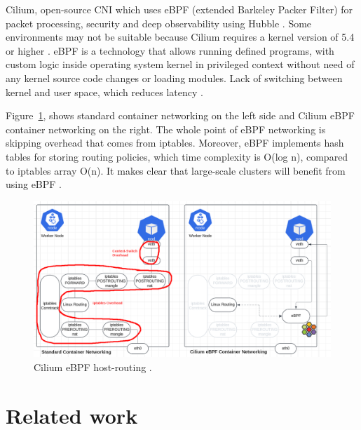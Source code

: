 Cilium, open-source CNI which uses eBPF (extended Barkeley Packer Filter) for packet processing, security and deep observability using Hubble \cite{CiliumOverview}. Some environments may not be suitable because Cilium requires a kernel version of 5.4 or higher \cite{CiliumInstall}. eBPF is a technology that allows running defined programs, with custom logic inside operating system kernel in privileged context without need of any kernel source code changes or loading modules. Lack of switching between kernel and user space, which reduces latency \cite{eBPF}. 

Figure~\ref{fig:ebpf_routing}, shows standard container networking on the left side and Cilium eBPF container networking on the right. The whole point of eBPF networking is skipping overhead that comes from iptables. Moreover, eBPF implements hash tables for storing routing policies, which time complexity is O(log n), compared to iptables array O(n). It makes clear that large-scale clusters will benefit from using eBPF \cite{IsovalentHash}. 

\begin{figure}[H]
    \centering
    \includegraphics[width=0.9\columnwidth]{images/ebpf_hostrouting.png}
    \caption{Cilium eBPF host-routing \cite{K8sIcons}\cite{LucidApp}\cite{CiliumCNIBenchmark}.}
    \label{fig:ebpf_routing}
\end{figure}




\section{Related work}
\label{sec:realted_work}

